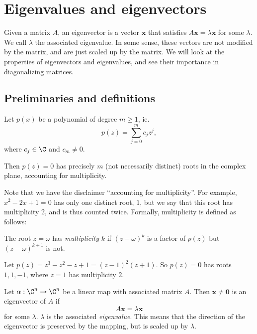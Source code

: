 \documentclass[a4paper]{article}
\begin{document}
\section{Eigenvalues and eigenvectors}
\label{sec:eigen}
Given a matrix $A$, an eigenvector is a vector $\mathbf{x}$ that satisfies $A\mathbf{x} = \lambda \mathbf{x}$ for some $\lambda$. We call $\lambda$ the associated eigenvalue. In some sense, these vectors are not modified by the matrix, and are just scaled up by the matrix. We will look at the properties of eigenvectors and eigenvalues, and see their importance in diagonalizing matrices.

\subsection{Preliminaries and definitions}
\begin{thm}
  Let $p(x)$ be a polynomial of degree $m \geq 1$, ie.
  \[
    p(z) = \sum_{j = 0}^m c_jz^j,
  \]
  where $c_j\in \C$ and $c_m \not= 0$.

  Then $p(z) = 0$ has precisely $m$ (not necessarily distinct) roots in the complex plane, accounting for multiplicity.
\end{thm}
Note that we have the disclaimer ``accounting for multiplicity''. For example, $x^2 - 2x + 1 = 0$ has only one distinct root, $1$, but we say that this root has multiplicity 2, and is thus counted twice. Formally, multiplicity is defined as follows:

\begin{defi}
  The root $z = \omega$ has \emph{multiplicity} $k$ if $(z - \omega)^k$ is a factor of $p(z)$ but $(z - \omega)^{k + 1}$ is not.
\end{defi}

\begin{eg}
  Let $p(z) = z^3 - z^2 - z + 1 = (z - 1)^2(z + 1)$. So $p(z) = 0$ has roots $1, 1, -1$, where $z = 1$ has multiplicity $2$.
\end{eg}

\begin{defi}
  Let $\alpha: \C^n\to \C^n$ be a linear map with associated matrix $A$. Then $\mathbf{x}\not= \mathbf{0}$ is an eigenvector of $A$ if
  \[
    A\mathbf{x} = \lambda\mathbf{x}
  \]
  for some $\lambda$. $\lambda$ is the associated \emph{eigenvalue}. This means that the direction of the eigenvector is preserved by the mapping, but is scaled up by $\lambda$.
\end{defi}
\end{document}
